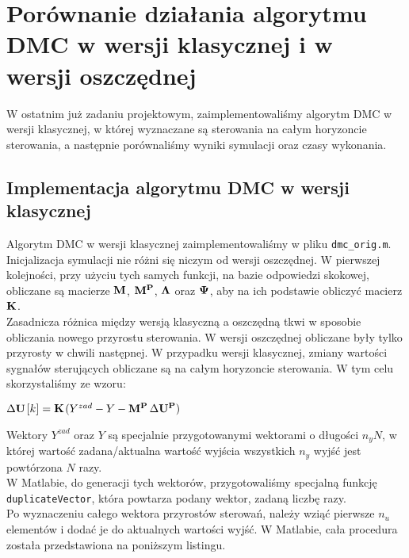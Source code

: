 \chapter{Porównanie działania algorytmu DMC w wersji klasycznej i w wersji oszczędnej}
\label{dmc_porownanie}

W ostatnim już zadaniu projektowym, zaimplementowaliśmy algorytm DMC w wersji
klasycznej, w której wyznaczane są sterowania na całym horyzoncie sterowania, a 
następnie porównaliśmy wyniki symulacji oraz czasy wykonania.

\section{Implementacja algorytmu DMC w wersji klasycznej}
\label{dmc_klasyk}
Algorytm DMC w wersji klasycznej zaimplementowaliśmy w pliku \verb+dmc_orig.m+.
Inicjalizacja symulacji nie różni się niczym od wersji oszczędnej.
W pierwszej kolejności, przy użyciu tych samych funkcji, na bazie odpowiedzi skokowej,
obliczane są macierze $\bf{} M \/$, $\bf{} M^{P} \/$,  $\bf{} \Lambda \/$ oraz 
$\bf{} \Psi \/$, aby na ich podstawie obliczyć macierz $\bf{} K \/$.\\

Zasadnicza różnica między wersją klasyczną a oszczędną tkwi w sposobie obliczania
nowego przyrostu sterowania. W wersji oszczędnej obliczane były tylko przyrosty w chwili 
następnej. W przypadku wersji klasycznej, zmiany wartości sygnałów sterujących obliczane są na całym
horyzoncie sterowania. W tym celu skorzystaliśmy ze wzoru:

\begin{center}
    $\Delta \bf{} U \/$$[k] = \bf{} K \/$$(Y^{zad} - Y - \bf{} M^{P} \/$$ \Delta \bf{}U^{P}\/)$
\end{center}

Wektory $Y^{zad}$ oraz $Y$ są specjalnie przygotowanymi wektorami o długości $n_{y}N$, w której
wartość zadana/aktualna wartość wyjścia wszystkich $n_{y}$ wyjść jest powtórzona $N$ razy.\\
W Matlabie, do generacji tych wektorów, przygotowaliśmy specjalną funkcję \verb+duplicateVector+, 
która powtarza podany wektor, zadaną liczbę razy.\\

Po wyznaczeniu całego wektora przyrostów sterowań, należy wziąć pierwsze $n_{u}$ elementów i dodać 
je do aktualnych wartości wyjść. W Matlabie, cała procedura została przedstawiona na poniższym listingu.

